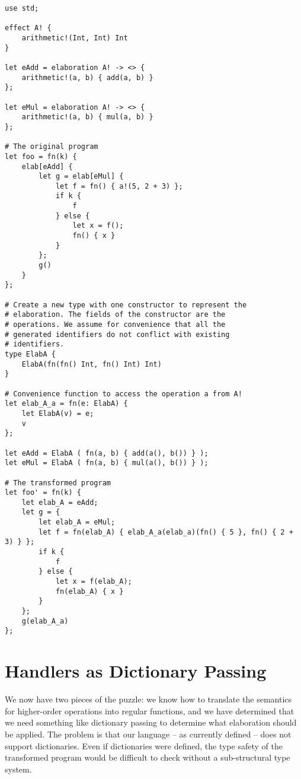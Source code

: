 \begin{lstlisting}[language=elaine,style=fancy,float,caption={\fixme{Some explanation. Should be higher-order?}}]
use std;

effect A! {
    arithmetic!(Int, Int) Int
}

let eAdd = elaboration A! -> <> {
    arithmetic!(a, b) { add(a, b) }
};

let eMul = elaboration A! -> <> {
    arithmetic!(a, b) { mul(a, b) }
};

# The original program
let foo = fn(k) {
    elab[eAdd] {
        let g = elab[eMul] {
            let f = fn() { a!(5, 2 + 3) };
            if k {
                f
            } else {
                let x = f();
                fn() { x }
            }
        };
        g()
    }
};

# Create a new type with one constructor to represent the
# elaboration. The fields of the constructor are the 
# operations. We assume for convenience that all the
# generated identifiers do not conflict with existing
# identifiers.
type ElabA {
    ElabA(fn(fn() Int, fn() Int) Int)
}

# Convenience function to access the operation a from A!
let elab_A_a = fn(e: ElabA) {
    let ElabA(v) = e;
    v
};

let eAdd = ElabA ( fn(a, b) { add(a(), b()) } );
let eMul = ElabA ( fn(a, b) { mul(a(), b()) } );

# The transformed program
let foo' = fn(k) {
    let elab_A = eAdd;
    let g = {
        let elab_A = eMul;
        let f = fn(elab_A) { elab_A_a(elab_a)(fn() { 5 }, fn() { 2 + 3) } };
        if k {
            f
        } else {
            let x = f(elab_A);
            fn(elab_A) { x }
        }
    };
    g(elab_A_a)
};
\end{lstlisting}

\section{Handlers as Dictionary Passing}

We now have two pieces of the puzzle: we know how to translate the semantics for higher-order operations into regular functions, and we have determined that we need something like dictionary passing to determine what elaboration should be applied. The problem is that our language -- as currently defined -- does not support dictionaries. Even if dictionaries were defined, the type safety of the transformed program would be difficult to check without a sub-structural type system.

